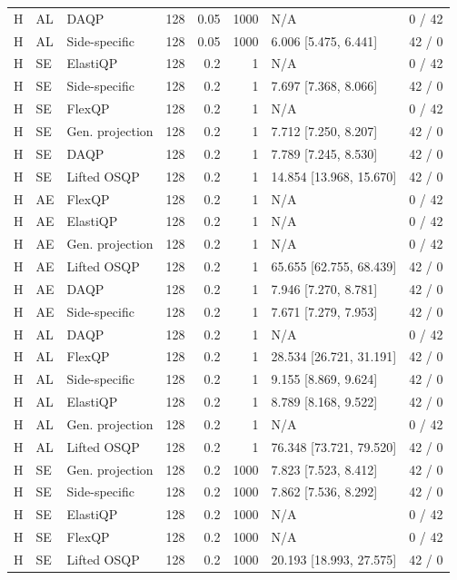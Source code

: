\begin{longtable}{@{}lllrrrlr@{}}
H & AL & DAQP & 128 & 0.05 & 1000 & N/A & 0 / 42 \\
H & AL & Side-specific & 128 & 0.05 & 1000 & 6.006 [5.475, 6.441] & 42 / 0 \\
H & SE & ElastiQP & 128 & 0.2 & 1 & N/A & 0 / 42 \\
H & SE & Side-specific & 128 & 0.2 & 1 & 7.697 [7.368, 8.066] & 42 / 0 \\
H & SE & FlexQP & 128 & 0.2 & 1 & N/A & 0 / 42 \\
H & SE & Gen. projection & 128 & 0.2 & 1 & 7.712 [7.250, 8.207] & 42 / 0 \\
H & SE & DAQP & 128 & 0.2 & 1 & 7.789 [7.245, 8.530] & 42 / 0 \\
H & SE & Lifted OSQP & 128 & 0.2 & 1 & 14.854 [13.968, 15.670] & 42 / 0 \\
H & AE & FlexQP & 128 & 0.2 & 1 & N/A & 0 / 42 \\
H & AE & ElastiQP & 128 & 0.2 & 1 & N/A & 0 / 42 \\
H & AE & Gen. projection & 128 & 0.2 & 1 & N/A & 0 / 42 \\
H & AE & Lifted OSQP & 128 & 0.2 & 1 & 65.655 [62.755, 68.439] & 42 / 0 \\
H & AE & DAQP & 128 & 0.2 & 1 & 7.946 [7.270, 8.781] & 42 / 0 \\
H & AE & Side-specific & 128 & 0.2 & 1 & 7.671 [7.279, 7.953] & 42 / 0 \\
H & AL & DAQP & 128 & 0.2 & 1 & N/A & 0 / 42 \\
H & AL & FlexQP & 128 & 0.2 & 1 & 28.534 [26.721, 31.191] & 42 / 0 \\
H & AL & Side-specific & 128 & 0.2 & 1 & 9.155 [8.869, 9.624] & 42 / 0 \\
H & AL & ElastiQP & 128 & 0.2 & 1 & 8.789 [8.168, 9.522] & 42 / 0 \\
H & AL & Gen. projection & 128 & 0.2 & 1 & N/A & 0 / 42 \\
H & AL & Lifted OSQP & 128 & 0.2 & 1 & 76.348 [73.721, 79.520] & 42 / 0 \\
H & SE & Gen. projection & 128 & 0.2 & 1000 & 7.823 [7.523, 8.412] & 42 / 0 \\
H & SE & Side-specific & 128 & 0.2 & 1000 & 7.862 [7.536, 8.292] & 42 / 0 \\
H & SE & ElastiQP & 128 & 0.2 & 1000 & N/A & 0 / 42 \\
H & SE & FlexQP & 128 & 0.2 & 1000 & N/A & 0 / 42 \\
H & SE & Lifted OSQP & 128 & 0.2 & 1000 & 20.193 [18.993, 27.575] & 42 / 0 \\

\end{longtable}
